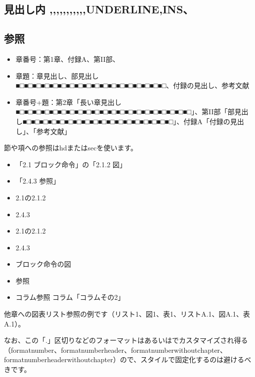 \subsection{見出し内 ,,,,,,,,,,,UNDERLINE,INS、}
\label{sec:2-4-2}

\subsection{参照}
\label{sec:2-4-3}


\begin{itemize}
\item 章番号：第1章、付録A、第II部、
\item 章題：章見出し、部見出し■□■□■□■□■□■□■□■□■□■□■□■□■□■□■□■□■□■□、付録の見出し、参考文献
\item 章番号+題：第2章「長い章見出し■□■□■□■□■□■□■□■□■□■□■□■□■□■□■□■□■□■□■□■□■□」、第II部「部見出し■□■□■□■□■□■□■□■□■□■□■□■□■□■□■□■□■□■□」、付録A「付録の見出し」、「参考文献」
\end{itemize}

節や項への参照はhdまたはsecを使います。


\begin{itemize}
\item 「2.1 ブロック命令」の「2.1.2 図」
\item 「2.4.3 参照」
\item 2.1の2.1.2
\item 2.4.3
\item 2.1の2.1.2
\item 2.4.3
\item ブロック命令の図
\item 参照
\item コラム参照 コラム「コラムその2」
\end{itemize}

他章への図表リスト参照の例です（リスト1、図1、表1、リストA.1、図A.1、表A.1）。

なお、この「.」区切りなどのフォーマットはあるいはでカスタマイズされ得る（format\textunderscore{}number、format\textunderscore{}number\textunderscore{}header、format\textunderscore{}number\textunderscore{}without\textunderscore{}chapter、format\textunderscore{}number\textunderscore{}header\textunderscore{}without\textunderscore{}chapter）ので、スタイルで固定化するのは避けるべきです。

